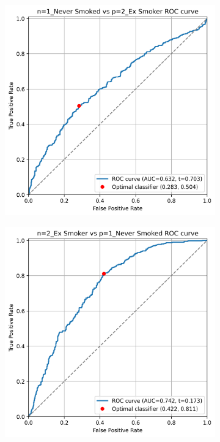\documentclass{article} %
\begin{document}
\begin{figure}[p]
    \begin{subfigure}{0.46\linewidth}
        \centering
        \includegraphics[width=\linewidth]{cohort2/test_1v2_roc.png}
    \end{subfigure}
    \hspace{4mm}
    \begin{subfigure}{0.46\linewidth}
        \centering
        \includegraphics[width=\linewidth]{cohort2/test_2v1_roc.png}

\end{subfigure}
\end{figure}
\end{document}
